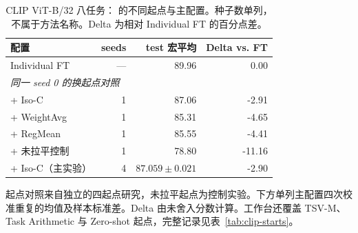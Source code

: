 \begin{table}[!htbp]
\centering\small
\caption{CLIP ViT-B/32 八任务：\method{} 的不同起点与主配置。种子数单列，不属于方法名称。Delta 为相对 Individual FT 的百分点差。}
\label{tab:clip-initializations}
\begin{tabular}{@{}lrrr@{}}
\toprule
配置 & seeds & test 宏平均 & Delta vs. FT \\
\midrule
Individual FT & --- & 89.96 & 0.00 \\
\multicolumn{4}{l}{\textit{同一 seed 0 的换起点对照}} \\
\method{} + Iso-C & 1 & 87.06 & -2.91 \\
\method{} + WeightAvg & 1 & 85.31 & -4.65 \\
\method{} + RegMean & 1 & 85.55 & -4.41 \\
\method{} + 未拉平控制 & 1 & 78.80 & -11.16 \\
\midrule
\rowcolor{black!8}
\method{} + Iso-C（主实验） & 4 & $87.059\pm 0.021$ & -2.90 \\
\bottomrule
\end{tabular}
\par\smallskip
{\footnotesize 起点对照来自独立的四起点研究，未拉平起点为控制实验。下方单列主配置四次校准重复的均值及样本标准差。Delta 由未舍入分数计算。工作台还覆盖 TSV-M、Task Arithmetic 与 Zero-shot 起点，完整记录见表~\ref{tab:clip-starts}。}
\end{table}
